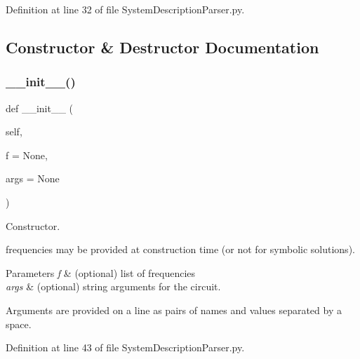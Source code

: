 Definition at line 32 of file System\+Description\+Parser.\+py.



\subsection{Constructor \& Destructor Documentation}
\mbox{\label{classSignalIntegrity_1_1Parsers_1_1SystemDescriptionParser_1_1SystemDescriptionParser_af9856388f7022892c3159ad55872a27e}} 
\subsubsection{\texorpdfstring{\+\_\+\+\_\+init\+\_\+\+\_\+()}{\_\_init\_\_()}}
{\footnotesize\ttfamily def \+\_\+\+\_\+init\+\_\+\+\_\+ (\begin{DoxyParamCaption}\item[{}]{self,  }\item[{}]{f = {\ttfamily None},  }\item[{}]{args = {\ttfamily None} }\end{DoxyParamCaption})}



Constructor. 

frequencies may be provided at construction time (or not for symbolic solutions).


\begin{DoxyParams}{Parameters}
{\em f} & (optional) list of frequencies \\
\hline
{\em args} & (optional) string arguments for the circuit.\\
\hline
\end{DoxyParams}
Arguments are provided on a line as pairs of names and values separated by a space. 

Definition at line 43 of file System\+Description\+Parser.\+py.



